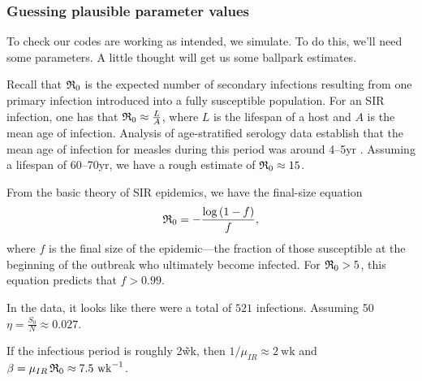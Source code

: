 \documentclass{beamer}\usepackage[]{graphicx}\usepackage[]{color}
\begin{document}
\begin{frame}[fragile] 

\frametitle{Guessing plausible parameter values}

\bi

\item To check our codes are working as intended, we simulate. To do this, we'll need some parameters. A little thought will get us some ballpark estimates.

\item Recall that $\mathfrak{R}_0$ is the expected number of secondary infections resulting from one primary infection introduced into a fully susceptible population.
For an SIR infection, one has that $\mathfrak{R}_0\approx\frac{L}{A}$, where $L$ is the lifespan of a host and $A$ is the mean age of infection.
Analysis of age-stratified serology data establish that the mean age of infection for measles during this period was around 4--5yr \citep{Anderson1991}.
Assuming a lifespan of 60--70yr, we have a rough estimate of $\mathfrak{R}_0\approx 15$.

\item From the basic theory of SIR epidemics, we have the final-size equation
$$\mathfrak{R}_0 = -\frac{\log{(1-f)}}{f},$$
where $f$ is the final size of the epidemic---the fraction of those susceptible at the beginning of the outbreak who ultimately become infected.
For $\mathfrak{R}_0>5$, this equation predicts that $f>0.99$.

\ei

\end{frame}

\begin{frame}[fragile]
\bi

\item In the data, it looks like there were a total of $521$ infections.
  Assuming 50%
  $\eta=\frac{S_0}{N}\approx0.027$.

\item If the infectious period is roughly 2\~wk, then $1/\mu_{IR} \approx 2~\text{wk}$ and $\beta = \mu_{IR}\,\mathfrak{R}_0 \approx 7.5~\text{wk}^{-1}$.

\ei

\end{frame}
\end{document}
